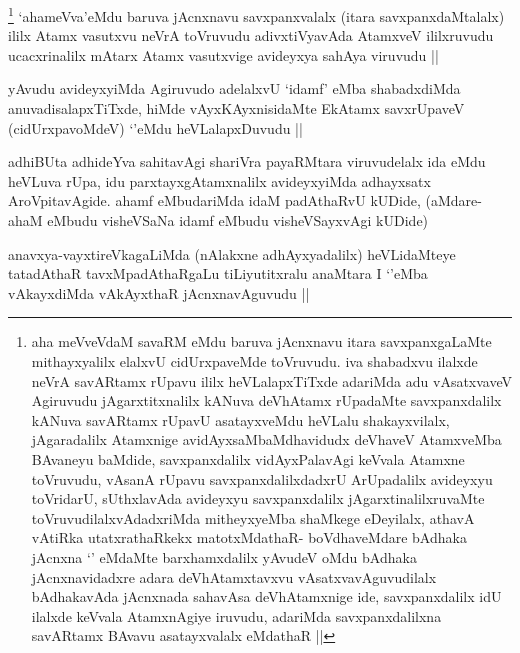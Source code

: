 \begin{artha}
\footnote{aha meVveVdaM savaRM eMdu baruva jAcnxnavu itara savxpanxgaLaMte mithayxyalilx elalxvU cidUrxpaveMde toVruvudu. iva shabadxvu ilalxde neVrA savARtamx rUpavu ililx heVLalapxTiTxde adariMda adu vAsatxvaveV Agiruvudu jAgarxtitxnalilx kANuva deVhAtamx rUpadaMte savxpanxdalilx kANuva savARtamx rUpavU asatayxveMdu heVLalu shakayxvilalx, jAgaradalilx Atamxnige avidAyxsaMbaMdhavidudx deVhaveV AtamxveMba BAvaneyu baMdide, savxpanxdalilx vidAyxPalavAgi keVvala Atamxne toVruvudu, vAsanA rUpavu savxpanxdalilxdadxrU ArUpadalilx avideyxyu toVridarU, sUthxlavAda avideyxyu savxpanxdalilx jAgarxtinalilxruvaMte toVruvudilalxvAdadxriMda mitheyxyeMba shaMkege eDeyilalx, athavA vAtiRka utatxrathaRkekx matotxMdathaR- boVdhaveMdare bAdhaka jAcnxna `\stext' eMdaMte barxhamxdalilx yAvudeV oMdu bAdhaka jAcnxnavidadxre adara deVhAtamxtavxvu vAsatxvavAguvudilalx bAdhakavAda jAcnxnada sahavAsa deVhAtamxnige ide, savxpanxdalilx idU ilalxde keVvala AtamxnAgiye iruvudu, adariMda savxpanxdalilxna savARtamx BAvavu asatayxvalalx eMdathaR ||} `ahameVva'eMdu baruva jAcnxnavu savxpanxvalalx (itara savxpanxdaMtalalx) ililx Atamx vasutxvu neVrA toVruvudu adivxtiVyavAda AtamxveV ililxruvudu ucacxrinalilx mAtarx Atamx vasutxvige avideyxya sahAya viruvudu ||
\end{artha}


\begin{artha}
yAvudu avideyxyiMda Agiruvudo adelalxvU `idamf' eMba shabadxdiMda anuvadisalapxTiTxde, hiMde vAyxKAyxnisidaMte EkAtamx savxrUpaveV (cidUrxpavoMdeV) `\stext'eMdu heVLalapxDuvudu ||
\end{artha}


\begin{artha}
adhiBUta adhideYva sahitavAgi shariVra payaRMtara viruvudelalx ida eMdu heVLuva rUpa, idu parxtayxgAtamxnalilx avideyxyiMda adhayxsatx AroVpitavAgide. ahamf eMbudariMda idaM padAthaRvU kUDide, (aMdare-ahaM eMbudu visheVSaNa idamf eMbudu visheVSayxvAgi kUDide)
\end{artha}


\begin{artha}
anavxya-vayxtireVkagaLiMda (nAlakxne adhAyxyadalilx) heVLidaMteye tatadAthaR tavxMpadAthaRgaLu tiLiyutitxralu anaMtara I `\stext'eMba vAkayxdiMda vAkAyxthaR jAcnxnavAguvudu ||
\end{artha}

